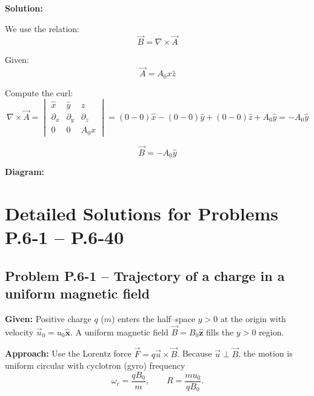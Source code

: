 \documentclass[12pt]{article}
\begin{document}
\textbf{Solution:}

We use the relation:
\[
\vec{B} = \nabla \times \vec{A}
\]

Given:
\[
\vec{A} = A_0 x \hat{z}
\]

Compute the curl:
\[
\nabla \times \vec{A} =
\begin{vmatrix}
\hat{x} & \hat{y} & \hat{z} \\
\partial_x & \partial_y & \partial_z \\
0 & 0 & A_0 x
\end{vmatrix}
= \left( 0 - 0 \right)\hat{x} - \left( 0 - 0 \right)\hat{y} + \left( 0 - 0 \right)\hat{z} + A_0 \hat{y}
= -A_0 \hat{y}
\]

\begin{tcolorbox}
\[
\boxed{\vec{B} = -A_0 \hat{y}}
\]
\end{tcolorbox}

\textbf{Diagram:}
\begin{center}
\end{center}


\section*{Detailed Solutions for Problems P.6‑1 – P.6‑40}

\bigskip
\subsection*{Problem P.6-1 – Trajectory of a charge in a uniform magnetic field}

\textbf{Given:} Positive charge $q$ ($m$) enters the half–space $y>0$ at the origin with velocity $\vec u_0=u_0\hat{\mathbf x}$.
A uniform magnetic field $\vec B=B_0\hat{\mathbf z}$ fills the $y>0$ region.

\textbf{Approach:}  Use the Lorentz force $\vec F=q\vec u\times\vec B$.
Because $\vec u \perp \vec B$, the motion is uniform circular with cyclotron (gyro) frequency
\[
\omega_c=\frac{qB_0}{m},\qquad R=\frac{mu_0}{qB_0}.
\]
\end{document}
